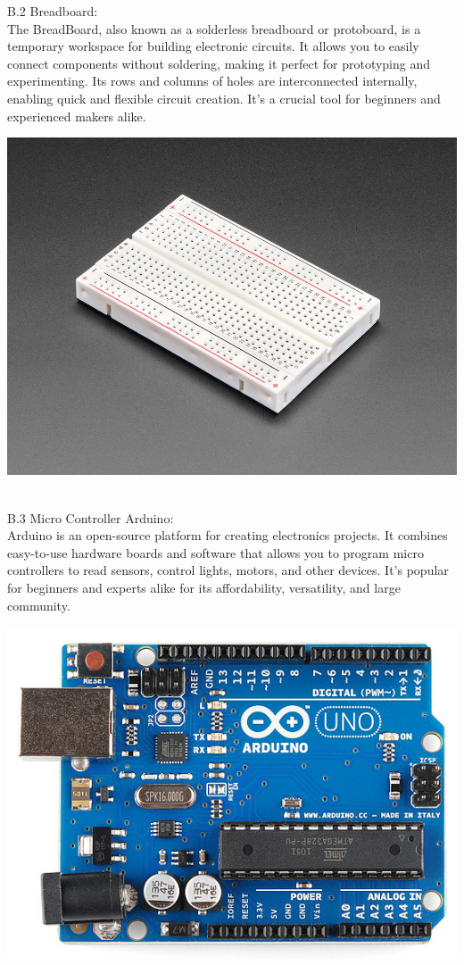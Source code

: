 \documentclass[conference, onecolumn]{IEEEtran}
\begin{document}
B.2 Breadboard:\\
The BreadBoard, also known as a solderless breadboard or protoboard, is a temporary workspace for building electronic circuits. It allows you to easily connect components without soldering, making it perfect for prototyping and experimenting. Its rows and columns of holes are interconnected internally, enabling quick and flexible circuit creation. It's a crucial tool for beginners and experienced makers alike.\\
\centerline{\includegraphics[width=3.8 in]{breadboard.png}}\\



B.3 Micro Controller Arduino:\\
Arduino is an open-source platform for creating electronics projects. It combines easy-to-use hardware boards and software that allows you to program micro controllers to read sensors, control lights, motors, and other devices. It's popular for beginners and experts alike for its affordability, versatility, and large community.\\
\centerline{\includegraphics[width=3.8 in]{arduino}}\\
\end{document}
